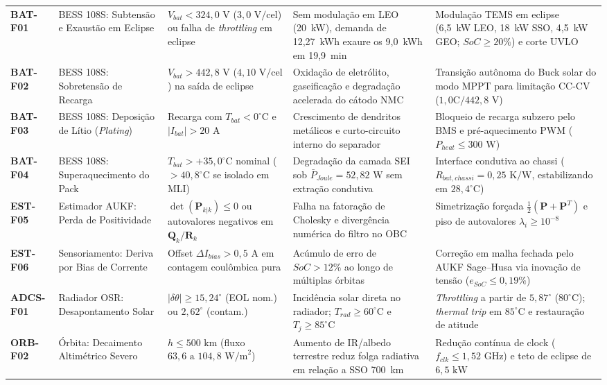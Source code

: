 \begin{table}[!ht]
{\begin{tabular}{lp{3.2cm}p{3.4cm}p{3.6cm}p{4.4cm}}
\textbf{BAT-F01}& BESS 108S: Subtensão e Exaustão em Eclipse & $V_{bat} < 324{,}0\text{ V}$ ($3{,}0\text{ V/cel}$) ou falha de \textit{throttling} em eclipse & Sem modulação em LEO (20~kW), demanda de 12,27~kWh exaure os 9,0~kWh em 19,9~min & Modulação TEMS em eclipse (6,5~kW LEO, 18~kW SSO, 4,5~kW GEO; $SoC \ge 20\%$) e corte UVLO \\
\textbf{BAT-F02}& BESS 108S: Sobretensão de Recarga & $V_{bat} > 442{,}8\text{ V}$ ($4{,}10\text{ V/cel}$) na saída de eclipse & Oxidação de eletrólito, gaseificação e degradação acelerada do cátodo NMC & Transição autônoma do Buck solar do modo MPPT para limitação CC-CV ($1{,}0\text{C} / 442{,}8\text{ V}$) \\
\textbf{BAT-F03}& BESS 108S: Deposição de Lítio (\textit{Plating}) & Recarga com $T_{bat} < 0^\circ\text{C}$ e $|I_{bat}| > 20\text{ A}$ & Crescimento de dendritos metálicos e curto-circuito interno do separador & Bloqueio de recarga subzero pelo BMS e pré-aquecimento PWM ($P_{heat} \le 300\text{ W}$) \\
\textbf{BAT-F04}& BESS 108S: Superaquecimento do Pack & $T_{bat} > +35{,}0^\circ\text{C}$ nominal ($> 40{,}8^\circ\text{C}$ se isolado em MLI) & Degradação da camada SEI sob $\bar{P}_{Joule} = 52{,}82\text{ W}$ sem extração condutiva & Interface condutiva ao chassi ($R_{bat,chassi}=0{,}25\text{ K/W}$, estabilizando em $28{,}4^\circ\text{C}$) \\
\textbf{EST-F05}& Estimador AUKF: Perda de Positividade & $\det(\mathbf{P}_{k|k}) \le 0$ ou autovalores negativos em $\mathbf{Q}_k/\mathbf{R}_k$ & Falha na fatoração de Cholesky e divergência numérica do filtro no OBC & Simetrização forçada $\frac{1}{2}(\mathbf{P}+\mathbf{P}^T)$ e piso de autovalores $\lambda_i \ge 10^{-8}$ \\
\textbf{EST-F06}& Sensoriamento: Deriva por Bias de Corrente & Offset $\Delta I_{bias} > 0{,}5\text{ A}$ em contagem coulômbica pura & Acúmulo de erro de $SoC > 12\%$ ao longo de múltiplas órbitas & Correção em malha fechada pelo AUKF Sage--Husa via inovação de tensão ($e_{SoC} \le 0{,}19\%$) \\ \hline
\textbf{ADCS-F01}& Radiador OSR: Desapontamento Solar & $|\delta\theta| \ge 15{,}24^\circ$ (EOL nom.) ou $2{,}62^\circ$ (contam.) & Incidência solar direta no radiador; $T_{rad} \ge 60^\circ\text{C}$ e $T_j \ge 85^\circ\text{C}$ & \textit{Throttling} a partir de $5{,}87^\circ$ ($80^\circ\text{C}$); \textit{thermal trip} em $85^\circ\text{C}$ e restauração de atitude \\
\textbf{ORB-F02}& Órbita: Decaimento Altimétrico Severo & $h \le 500\text{ km}$ (fluxo $63{,}6\text{ a }104{,}8\text{ W/m}^2$) & Aumento de IR/albedo terrestre reduz folga radiativa em relação a SSO 700~km & Redução contínua de clock ($f_{clk} \le 1{,}52\text{ GHz}$) e teto de eclipse de $6{,}5\text{ kW}$ \\

\end{tabular}}
\end{table}

